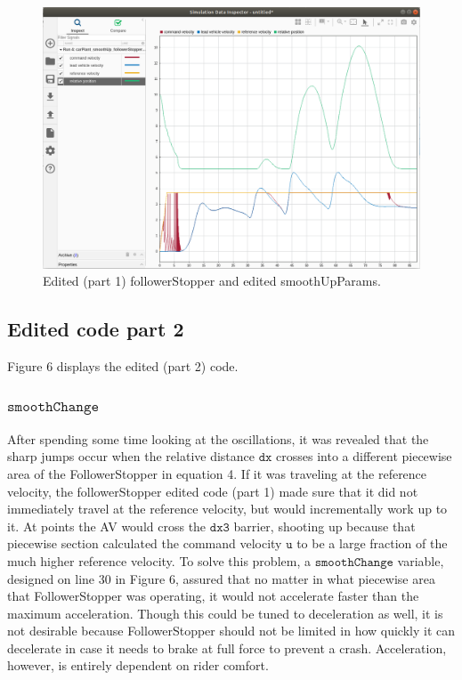 \documentclass[12pt, letterpaper]{article}
\begin{document}
\begin{figure}[h!]
\begin{center}
\includegraphics[width=6in]{editedFS_editedSUP_1}
\caption{Edited (part 1) followerStopper and edited smoothUpParams.}
\label{default}
\end{center}
\end{figure}

\subsection{Edited code part 2}
Figure 6 displays the edited (part 2) code.
\subsubsection{$\mathtt{smoothChange}$}
After spending some time looking at the oscillations, it was revealed that the sharp jumps occur when the relative distance $\mathtt{dx}$ crosses into a different piecewise area of the FollowerStopper in equation 4. If it was traveling at the reference velocity, the followerStopper edited code (part 1) made sure that it did not immediately travel at the reference velocity, but would incrementally work up to it. At points the AV would cross the $\mathtt{dx3}$ barrier, shooting up because that piecewise section calculated the command velocity $\mathtt{u}$ to be a large fraction of the much higher reference velocity. To solve this problem, a $\mathtt{smoothChange}$ variable, designed on line 30 in Figure 6, assured that no matter in what piecewise area that FollowerStopper was operating, it would not accelerate faster than the maximum acceleration. Though this could be tuned to deceleration as well, it is not desirable because FollowerStopper should not be limited in how quickly it can decelerate in case it needs to brake at full force to prevent a crash. Acceleration, however, is entirely dependent on rider comfort.
\end{document}
